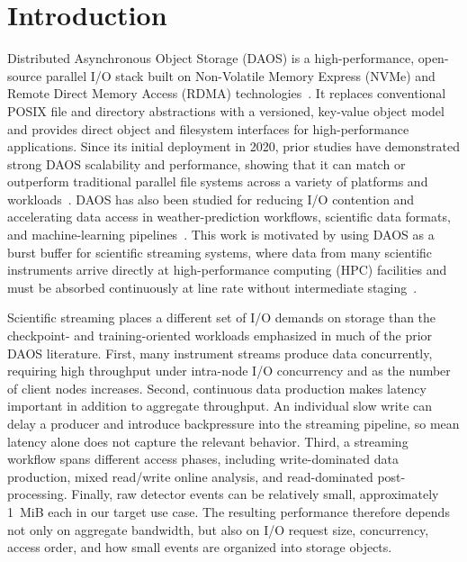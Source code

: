 \section{Introduction}

Distributed Asynchronous Object Storage (DAOS) is a high-performance, open-source parallel I/O stack built on Non-Volatile Memory Express (NVMe) and Remote Direct Memory Access (RDMA) technologies~\cite{daos-exascale-storage2016sc, daos-intro2020, daos-dram-intro2023, daos-github}. It replaces conventional POSIX file and directory abstractions with a versioned, key-value object model and provides direct object and filesystem interfaces for high-performance applications. Since its initial deployment in 2020, prior studies have demonstrated strong DAOS scalability and performance, showing that it can match or outperform traditional parallel file systems across a variety of platforms and workloads~\cite{daos-vs-lustre2022pdsw, daos-arm2023SCAsia, daos-scalability2023SCAsia, daos-perf-explore2024scw, DAOS-aurora-20-node-test2024scw, XianheSun2023evaluation}. DAOS has also been studied for reducing I/O contention and accelerating data access in weather-prediction workflows, scientific data formats, and machine-learning pipelines~\cite{hdf5-daos2022tpds, daos-adios2024ISC, hpc-weather2023ipdps, manubens2024reducing, daos-smartnic2025scw, devarajan2021dlio, mlperf-storage-github, brim2025dug-daos-aio}. This work is motivated by using DAOS as a burst buffer for scientific streaming systems, where data from many scientific instruments arrive directly at high-performance computing (HPC) facilities and must be absorbed continuously at line rate without intermediate staging~\cite{ejfat2022indis}.

Scientific streaming places a different set of I/O demands on storage than the checkpoint- and training-oriented workloads emphasized in much of the prior DAOS literature. First, many instrument streams produce data concurrently, requiring high throughput under intra-node I/O concurrency and as the number of client nodes increases. Second, continuous data production makes latency important in addition to aggregate throughput. An individual slow write can delay a producer and introduce backpressure into the streaming pipeline, so mean latency alone does not capture the relevant behavior. Third, a streaming workflow spans different access phases, including write-dominated data production, mixed read/write online analysis, and read-dominated post-processing. Finally, raw detector events can be relatively small, approximately 1~MiB each in our target use case. The resulting performance therefore depends not only on aggregate bandwidth, but also on I/O request size, concurrency, access order, and how small events are organized into storage objects.


